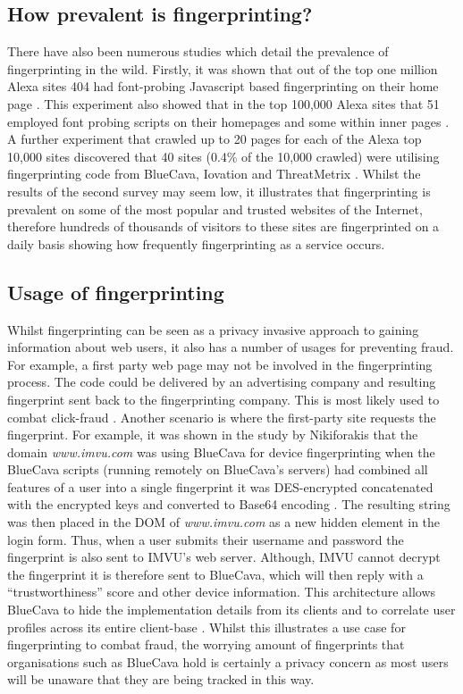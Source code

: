 \documentclass[12pt]{article}
\begin{document}
\subsection{How prevalent is fingerprinting?}
There have also been numerous studies which detail the prevalence of fingerprinting in the wild. Firstly, it was shown that out of the top one million Alexa sites 404 had font-probing Javascript based fingerprinting on their home page \parencite{dustingFP}. This experiment also showed that in the top 100,000 Alexa sites that 51 employed font probing scripts on their homepages and some within inner pages \parencite{dustingFP}. A further experiment that crawled up to 20 pages for each of the Alexa top 10,000 sites discovered that 40 sites (0.4\% of the 10,000 crawled) were utilising fingerprinting code from BlueCava, Iovation and ThreatMetrix \parencite{cookielessMonster}. Whilst the results of the second survey may seem low, it illustrates that fingerprinting is prevalent on some of the most popular and trusted websites of the Internet, therefore hundreds of thousands of visitors to these sites are fingerprinted on a daily basis \parencite{cookielessMonster} showing how frequently fingerprinting as a service occurs.

\subsection{Usage of fingerprinting}
Whilst fingerprinting can be seen as a privacy invasive approach to gaining information about web users, it also has a number of usages for preventing fraud. For example, a first party web page may not be involved in the fingerprinting process. The code could be delivered by an advertising company and resulting fingerprint sent back to the fingerprinting company. This is most likely used to combat click-fraud \parencite{cookielessMonster}. Another scenario is where the first-party site requests the fingerprint. For example, it was shown in the study by Nikiforakis that the domain \textit{www.imvu.com} was using BlueCava for device fingerprinting when the BlueCava scripts (running remotely on BlueCava's servers) had combined all features of a user into a single fingerprint it was DES-encrypted concatenated with the encrypted keys and converted to Base64 encoding \parencite{cookielessMonster}. The resulting string was then placed in the DOM of \textit{www.imvu.com} as a new hidden element in the login form. Thus, when a user submits their username and password the fingerprint is also sent to IMVU's web server. Although, IMVU cannot decrypt the fingerprint it is therefore sent to BlueCava, which will then reply with a “trustworthiness” score and other device information. This architecture allows BlueCava to hide the implementation details from its clients and to correlate user profiles across its entire client-base \parencite{cookielessMonster}. Whilst this illustrates a use case for fingerprinting to combat fraud, the worrying amount of fingerprints that organisations such as BlueCava hold is certainly a privacy concern as most users will be unaware that they are being tracked in this way.  \\ 
\end{document}
